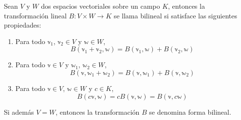 \begin{definition}
    Sean $V$ y $W$ dos espacios vectoriales sobre un campo $K$, entonces la transformación lineal $B: V \times W \longrightarrow K$ se llama bilineal si satisface las siguientes propiedades:
    \begin{enumerate}[label=\roman*)]
        \item Para todo $\mathbb{v}_1$, $\mathbb{v}_2 \in V$ y $\mathbb{w} \in W$,
        $$B(\mathbb{v}_1 + \mathbb{v}_2, \mathbb{w}) = B(\mathbb{v}_1, \mathbb{w}) + B(\mathbb{v}_2, \mathbb{w})$$\newpage
        \item Para todo $\mathbb{v} \in V$ y $\mathbb{w}_1$, $\mathbb{w}_2 \in W$,
        $$B(\mathbb{v}, \mathbb{w}_1 + \mathbb{w}_2) = B(\mathbb{v}, \mathbb{w}_1) + B(\mathbb{v}, \mathbb{w}_2)$$
        \item Para todo $\mathbb{v} \in V$, $\mathbb{w} \in W$ y $c \in K$,
        $$B(c\mathbb{v}, \mathbb{w}) = cB(\mathbb{v}, \mathbb{w}) = B(\mathbb{v}, c\mathbb{w})$$
    \end{enumerate}
    Si además $V = W$, entonces la transformación $B$ se denomina forma bilineal.
\end{definition}

